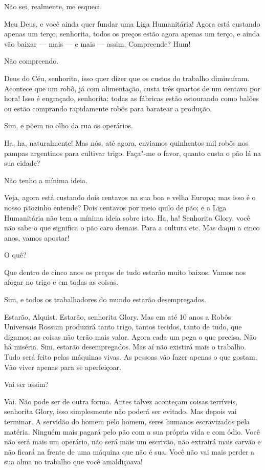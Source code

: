  Não sei, realmente, me esqueci.

 Meu Deus, e você ainda quer fundar uma Liga Humanitária! Agora
está custando apenas um terço, senhorita, todos os preços estão agora apenas um
terço, e ainda vão baixar --- mais --- e mais --- assim. Compreende? Hum!

 Não compreendo.

 Deus do Céu, senhorita, isso quer dizer que os custos do trabalho diminuíram.
Acontece que um robô, já com alimentação, custa três quartos de um centavo por
hora! Isso é engraçado, senhorita: todas as fábricas estão estourando como
balões ou estão comprando rapidamente robôs para baratear a produção.

 Sim, e põem no olho da rua os operários.

 Ha, ha, naturalmente! Mas nós, até agora, enviamos quinhentos
mil robôs nos pampas argentinos para cultivar trigo. Faça"-me o favor, quanto
custa o pão lá na sua cidade?

 Não tenho a mínima ideia.

 Veja, agora está custando dois centavos na sua boa e velha Europa; mas
isso é o nosso pãozinho entende? Dois centavos por meio quilo de pão; e a Liga
Humanitária não tem a mínima ideia sobre isto. Ha, ha! Senhorita Glory, você não
sabe o que significa o pão caro demais. Para a cultura etc. Mas daqui a cinco
anos, vamos apostar!

 O quê?

 Que dentro de cinco anos os preços de tudo estarão muito baixos. 
Vamos nos afogar no trigo e em todas as coisas.

 Sim, e todos os trabalhadores do mundo estarão desempregados.

  Estarão, Alquist. Estarão, senhorita Glory. Mas em
até 10 anos a Robôs Universais Rossum produzirá tanto trigo, tantos tecidos,
tanto de tudo, que digamos: as coisas não terão mais valor. Agora cada um pega o
que precisa. Não há miséria. Sim, estarão desempregados. Mas aí não
existirá mais o trabalho. Tudo será feito pelas máquinas vivas. As pessoas vão fazer
apenas o que gostam. Vão viver apenas para se aperfeiçoar.

  Vai ser assim?

 Vai. Não pode ser de outra forma. Antes talvez aconteçam coisas
terríveis, senhorita Glory, isso simplesmente não poderá ser evitado. Mas depois
vai terminar. A servidão do homem pelo homem, seres humanos escravizados
pela matéria. Ninguém mais pagará pelo pão com a sua própria vida e com ódio.
Você não será mais um operário, não será mais um escrivão, não extrairá
mais carvão e não ficará na frente de uma máquina que não é sua. Você não vai mais
perder a sua alma no trabalho que você amaldiçoava!

